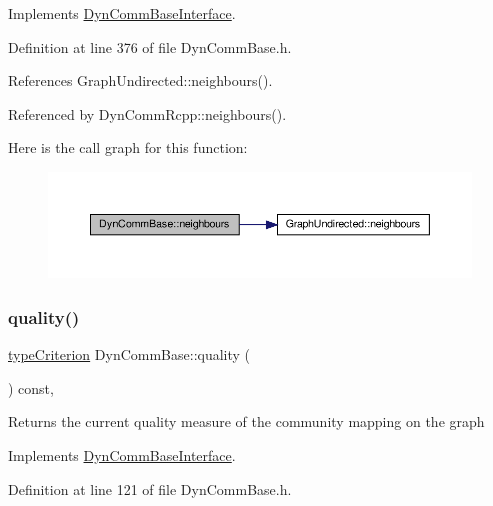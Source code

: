 Implements \hyperlink{classDynCommBaseInterface_a9d6f5345d8cdf9e0d70b7a71bff8ade6}{Dyn\+Comm\+Base\+Interface}.



Definition at line 376 of file Dyn\+Comm\+Base.\+h.



References Graph\+Undirected\+::neighbours().



Referenced by Dyn\+Comm\+Rcpp\+::neighbours().

Here is the call graph for this function\+:
\nopagebreak
\begin{figure}[H]
\begin{center}
\leavevmode
\includegraphics[width=350pt]{classDynCommBase_a3500faab82a0547422b2202b79f49718_cgraph}
\end{center}
\end{figure}
\mbox{\label{classDynCommBase_a316b2c63a025810211d205ef6bf1d06c}} 
\subsubsection{\texorpdfstring{quality()}{quality()}}
{\footnotesize\ttfamily \hyperlink{criterionInterface_8h_af71ff22f6355fd69a4a62104bfd59a83}{type\+Criterion} Dyn\+Comm\+Base\+::quality (\begin{DoxyParamCaption}{ }\end{DoxyParamCaption}) const\hspace{0.3cm}{\ttfamily [inline]}, {\ttfamily [virtual]}}

\begin{DoxyReturn}{Returns}
the current quality measure of the community mapping on the graph 
\end{DoxyReturn}


Implements \hyperlink{classDynCommBaseInterface_a42863260fe57e0982be227255d4f8464}{Dyn\+Comm\+Base\+Interface}.



Definition at line 121 of file Dyn\+Comm\+Base.\+h.



